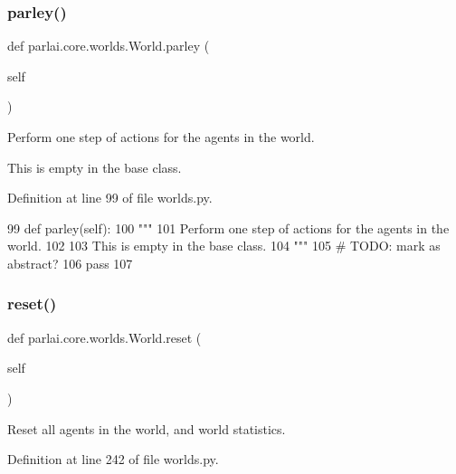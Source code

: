 \subsubsection{\texorpdfstring{parley()}{parley()}}
{\footnotesize\ttfamily def parlai.\+core.\+worlds.\+World.\+parley (\begin{DoxyParamCaption}\item[{}]{self }\end{DoxyParamCaption})}

\begin{DoxyVerb}Perform one step of actions for the agents in the world.

This is empty in the base class.
\end{DoxyVerb}
 

Definition at line 99 of file worlds.\+py.


\begin{DoxyCode}
99     \textcolor{keyword}{def }parley(self):
100         \textcolor{stringliteral}{"""}
101 \textcolor{stringliteral}{        Perform one step of actions for the agents in the world.}
102 \textcolor{stringliteral}{}
103 \textcolor{stringliteral}{        This is empty in the base class.}
104 \textcolor{stringliteral}{        """}
105         \textcolor{comment}{# TODO: mark as abstract?}
106         \textcolor{keywordflow}{pass}
107 
\end{DoxyCode}
\mbox{\label{classparlai_1_1core_1_1worlds_1_1World_a363cc32add41645e1ba405808fafb5b4}} 
\subsubsection{\texorpdfstring{reset()}{reset()}}
{\footnotesize\ttfamily def parlai.\+core.\+worlds.\+World.\+reset (\begin{DoxyParamCaption}\item[{}]{self }\end{DoxyParamCaption})}

\begin{DoxyVerb}Reset all agents in the world, and world statistics.
\end{DoxyVerb}
 

Definition at line 242 of file worlds.\+py.


